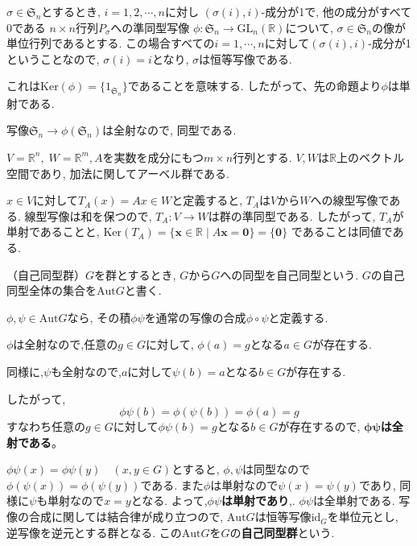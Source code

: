 $\sigma \in \mathfrak{S}_n$とするとき, $i=1,2,\cdots,n$に対し
 $(\sigma(i),i)$-成分が1で, 他の成分がすべて0である
 $n\times n$行列$P_\sigma$への準同型写像
 $\phi: \mathfrak{S}_n \to \mathrm{GL}_n(\mathbb{R}) $について, 
 $\sigma \in \mathfrak{S}_n$の像が単位行列であるとする.
 この場合すべての$i=1,\cdots,n$に対して$(\sigma(i),i)$-成分が1ということなので,
 $\sigma(i)=i$となり, $\sigma$は恒等写像である.
 
 これは$\mathrm{Ker}(\phi) = \{1_{\mathfrak{S}_n}\}$であることを意味する.
 したがって、先の命題より$\phi$は単射である.
 
 写像$\mathfrak{S}_n \to \phi(\mathfrak{S}_n)$は全射なので, 同型である.\newline

$ V=\mathbb{R}^n,\; W=\mathbb{R}^m, A$を実数を成分にもつ$m\times n$行列とする. 
$V,W$は$\mathbb{R}$上のベクトル空間であり, 加法に関してアーベル群である.

$ x \in V$に対して$T_A(x)=Ax \in W $と定義すると, $T_A$は$V$から$W$への線型写像である.
線型写像は和を保つので, $T_A: V\to W$は群の準同型である.
したがって, $T_A$が単射であることと,
$ \mathrm{Ker}(T_A) = \{ \pmb{x} \in \mathbb{R} \mid A\pmb{x} = \pmb{0}\} = \{ \pmb{0} \}$ 
であることは同値である.\newline

\begin{dfn*}
	（自己同型群）$G$を群とするとき, $G$から$G$への同型を自己同型という.
	$G$の自己同型全体の集合を$\mathrm{Aut}G$と書く.
\end{dfn*} 

$\phi,\psi \in \mathrm{Aut}G$なら, 
その積$\phi\psi$を通常の写像の合成$\phi\circ\psi$と定義する.

$\phi$は全射なので,任意の$g \in G$に対して,
$\phi(a)=g$となる$a \in G$が存在する.

同様に,$\psi$も全射なので,$a$に対して$\psi(b)=a$となる$b\in G$が存在する.

したがって,
\[ \phi\psi(b)=\phi(\psi(b))=\phi(a)=g \]
すなわち任意の$g\in G$に対して$\phi\psi(b)=g$となる$b\in G$が存在するので,
$\mathbf{\phi\psi}$\textbf{は全射である}。

$\phi\psi(x)=\phi\psi(y)\quad (x,y \in G)$とすると,
$\phi, \psi$は同型なので$\phi(\psi(x))=\phi(\psi(y))$である.
また$\phi$は単射なので$\psi(x)=\psi(y)$であり,
同様に$\psi$も単射なので$x=y$となる.
よって,\textbf{$\phi\psi$は単射であり},.
$\phi\psi$は全単射である.
写像の合成に関しては結合律が成り立つので,
$\mathrm{Aut}G$は恒等写像$\mathrm{id}_G$を単位元とし, 
逆写像を逆元とする群となる.
この$\mathrm{Aut}G$を$G$の\textbf{自己同型群}という.\newline

